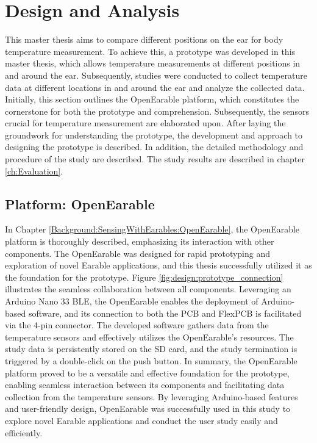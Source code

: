\chapter{Design and Analysis}
\label{ch:Design}
This master thesis aims to compare different positions on the ear for body temperature measurement. 
To achieve this, a prototype was developed in this master thesis, which allows temperature measurements at different positions in and around the ear. 
Subsequently, studies were conducted to collect temperature data at different locations in and around the ear and analyze the collected data.
Initially, this section outlines the OpenEarable platform, which constitutes the cornerstone for both the prototype and comprehension. 
Subsequently, the sensors crucial for temperature measurement are elaborated upon.
After laying the groundwork for understanding the prototype, the development and approach to designing the prototype is described.
In addition, the detailed methodology and procedure of the study are described.
The study results are described in chapter \ref{ch:Evaluation}.

\section{Platform: OpenEarable}
\label{ch:Design:Prototype:OpenEarable}
In Chapter \ref{Background:SensingWithEarables:OpenEarable}, the OpenEarable platform is thoroughly described, emphasizing its interaction with other components. 
The OpenEarable was designed for rapid prototyping and exploration of novel Earable applications, and this thesis successfully utilized it as the foundation for the prototype. 
Figure \ref{fig:design:prototype_connection} illustrates the seamless collaboration between all components. 
Leveraging an Arduino Nano 33 BLE, the OpenEarable enables the deployment of Arduino-based software, and its connection to both the PCB and FlexPCB is facilitated via the 4-pin connector. 
The developed software gathers data from the temperature sensors and effectively utilizes the OpenEarable's resources. 
The study data is persistently stored on the SD card, and the study termination is triggered by a double-click on the push button.
In summary, the OpenEarable platform proved to be a versatile and effective foundation for the prototype, enabling seamless interaction between its components and facilitating data collection from the temperature sensors. 
By leveraging Arduino-based features and user-friendly design, OpenEarable was successfully used in this study to explore novel Earable applications and conduct the user study easily and efficiently.

